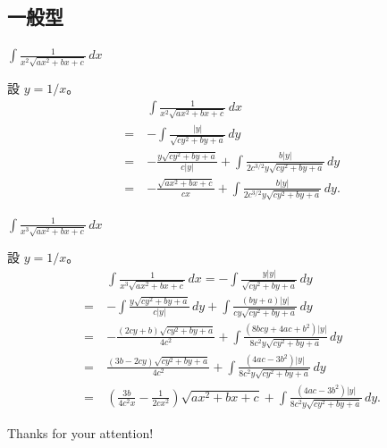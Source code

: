 \documentclass{beamer}
\theoremstyle{remark}
\begin{document}
\begin{CJK}{UTF8}{bsmi}
\subsection{一般型}
\begin{frame}{$\displaystyle \int \frac{1}{x^2 \sqrt{ax^2 + bx + c}}\,dx$}
  \begin{solution}
    設 $y = 1/x$。
    \begin{align*}
	 & \int \frac{1}{x^2 \sqrt{ax^2 + bx + c}}\,dx\\
      =\:& -\int \frac{|y|}{\sqrt{cy^2 + by + a}}\,dy\\
      =\:& -\frac{y \sqrt{cy^2 + by + a}}{c \left| y \right|} + \int \frac{b \left| y \right|}
	   {2c^{3/2}y \sqrt{cy^2 + by + a}}\,dy\\
      =\:& -\frac{\sqrt{ax^2 + bx + c}}{cx} + \int \frac{b \left| y \right|} {2c^{3/2}y \sqrt{cy^2 + by + a}}\,dy.
    \end{align*}
  \end{solution}
\end{frame}

\begin{frame}{$\displaystyle \int \frac{1}{x^3 \sqrt{ax^2 + bx + c}}\,dx$}
  \begin{solution}
    設 $y = 1/x$。
    \small
    \begin{align*}
	 & \int \frac{1}{x^3 \sqrt{ax^2 + bx + c}}\,dx = -\int \frac{y \left| y \right|}{\sqrt{cy^2 + by + a}}\,dy\\
      =\:& -\int \frac{y \sqrt{cy^2 + by + a}}{c \left| y \right|}\,dy + \int \frac{\left( by + a \right) |y|}
	   {cy \sqrt{cy^2 + by + a}}\,dy\\
      =\:& -\frac{\left( 2cy + b \right) \sqrt{cy^2 + by + a}}{4c^2} + \int \frac{\left( 8bcy + 4ac + b^2 \right) |y|}
	   {8c^2 y \sqrt{cy^2 + by + a}}\,dy\\
      =\:& \frac{\left( 3b - 2cy \right) \sqrt{cy^2 + by + a}}{4c^2} + \int \frac{\left( 4ac - 3b^2 \right) |y|}
	   {8c^2 y \sqrt{cy^2 + by + a}}\,dy\\
      =\:& \left( \frac{3b}{4c^2 x} - \frac{1}{2cx^2} \right) \sqrt{ax^2 + bx + c} + \int \frac{\left( 4ac - 3b^2 \right) |y|}
	   {8c^2 y \sqrt{cy^2 + by + a}}\,dy.
    \end{align*}
  \end{solution}
\end{frame}

\begin{frame}
  \begin{center}
    \huge Thanks for your attention!
  \end{center}
\end{frame}
\end{CJK}
\end{document}

